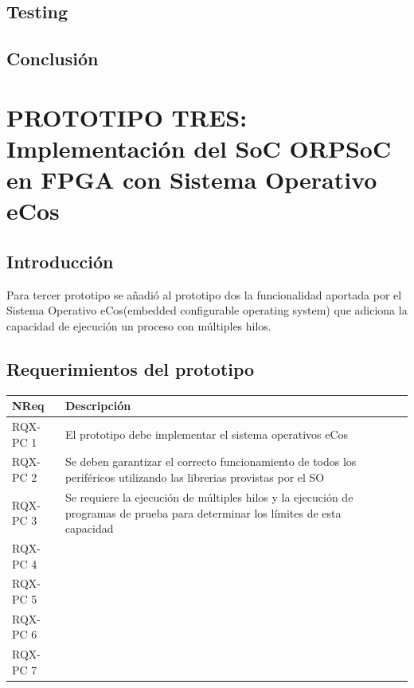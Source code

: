 		
		\subsection{Testing}


		\subsection{Conclusión}


	\section{PROTOTIPO TRES: Implementación del SoC ORPSoC en FPGA con Sistema Operativo eCos}
		\subsection{Introducción}
		Para tercer prototipo se añadió al prototipo dos la funcionalidad aportada por el Sistema Operativo eCos(embedded configurable operating system) que
		adiciona la capacidad de ejecución un proceso con múltiples hilos. 

		\subsection{Requerimientos del prototipo}

		\begin{table}[h]
		\centering		
		\begin{tabular}{ p{2.5cm} p{8cm} p{3cm} }
		\hline 
		\rowcolor[gray]{0.8} N\textordmasculine Req & Descripción\\
		\hline 
		RQX-PC 1 & El prototipo debe implementar el sistema operativos eCos\\ 
		\hline 
		RQX-PC 2 & Se deben garantizar el correcto funcionamiento de todos los periféricos utilizando las librerias provistas por el SO\\ 
		\hline 
		RQX-PC 3 & Se requiere la ejecución de múltiples hilos y la ejecución de programas de prueba para determinar los límites de esta capacidad \\ 
		\hline
		RQX-PC 4 & \\
		\hline
		RQX-PC 5 & \\
		\hline
		RQX-PC 6 & \\
		\hline
		RQX-PC 7 & \\
		\hline		
		\end{tabular}
		\end{table}
		
		

